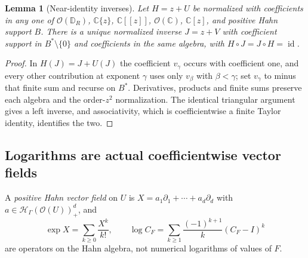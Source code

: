 \documentclass[11pt,letterpaper]{article}
\newtheorem{lemma}[lemma]{Lemma}
\theoremstyle{definition}
\theoremstyle{remark}
\newcommand{\C}{\mathbb C}
\newcommand{\HH}{\mathscr H}
\newcommand{\OO}{\mathcal O}
\newcommand{\id}{\operatorname{id}}
\numberwithin{equation}{section}
\begin{document}
\begin{lemma}[Near-identity inverses]\label{dyn:lem:inverse}
Let $H=z+U$ be normalized with coefficients in any one of
$\OO(\mathbb D_R)$, $\C\{z\}$, $\C[[z]]$, $\OO(\C)$, $\C[z]$, and positive
Hahn support $B$. There is a unique normalized inverse $J=z+V$ with
coefficient support in $B^{*}\setminus\{0\}$ and coefficients in the same
algebra, with $H\circ J=J\circ H=\id$.
\end{lemma}
\begin{proof}
In $H(J)=J+U(J)$ the coefficient $v_\gamma$ occurs with coefficient one,
and every other contribution at exponent $\gamma$ uses only $v_\beta$ with
$\beta<\gamma$; set $v_\gamma$ to minus that finite sum and recurse on
$B^{*}$. Derivatives, products and finite sums preserve each algebra and
the order-$z^{2}$ normalization. The identical triangular argument gives a
left inverse, and associativity, which is coefficientwise a finite Taylor
identity, identifies the two.
\end{proof}

\subsection{Logarithms are actual coefficientwise vector fields}
\label{dyn:sec:flows}

A \emph{positive Hahn vector field} on $U$ is
$X=a_1\partial_1+\cdots+a_d\partial_d$ with
$a\in\HH_\Gamma(\OO(U))_+^{d}$, and
\begin{equation}\label{dyn:eq:explog}
 \exp X=\sum_{k\ge0}\frac{X^{k}}{k!},\qquad
 \log C_F=\sum_{k\ge1}\frac{(-1)^{k+1}}{k}(C_F-I)^{k}
\end{equation}
are operators on the Hahn algebra, not numerical logarithms of values of
$F$.
\end{document}
